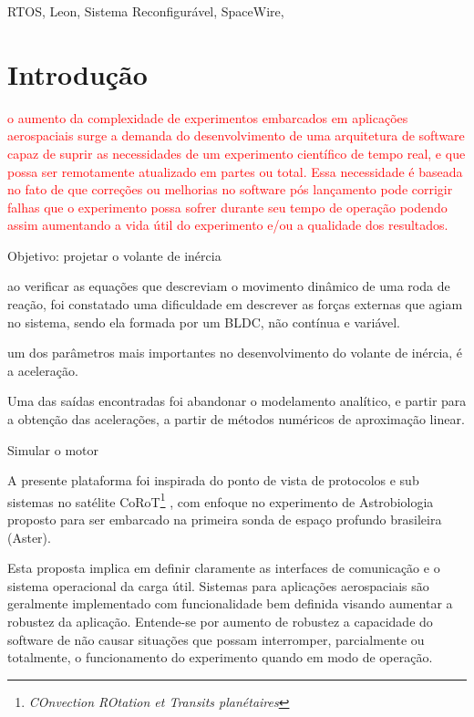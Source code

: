 \documentclass[journal,a4paper,oneside,twocolumn]{IEEEtran}
\begin{document}
\begin{IEEEkeywords}
	RTOS, Leon, Sistema Reconfigurável, SpaceWire, 
\end{IEEEkeywords}


\IEEEpeerreviewmaketitle



\section{Introdução}
\textcolor{red}{
	 o aumento da complexidade de experimentos embarcados em aplicações aerospaciais surge a demanda do desenvolvimento de uma arquitetura de software capaz de suprir as necessidades de um experimento científico  de tempo real, e que possa ser remotamente atualizado em partes ou total.
	Essa necessidade é baseada no fato de que correções ou melhorias no software pós lançamento pode corrigir falhas que o experimento possa sofrer durante seu tempo de operação podendo assim aumentando  a vida útil do experimento e/ou a qualidade dos resultados.}

	Objetivo: projetar o volante de inércia
	
	ao verificar as equações que descreviam o movimento dinâmico de uma roda de reação, foi constatado uma dificuldade em descrever as forças externas que agiam no sistema, sendo ela formada por um BLDC, não contínua e variável.
	
	um dos parâmetros mais importantes no desenvolvimento do volante de inércia, é a aceleração.
	
	Uma das saídas encontradas foi abandonar o modelamento analítico, e partir para a obtenção das acelerações, a partir de métodos numéricos de aproximação linear.
	
	Simular o motor
	
	
	
	 A presente plataforma foi inspirada do ponto de vista de protocolos e sub sistemas no satélite CoRoT\footnote{\textit{COnvection ROtation et Transits planétaires}} \cite{cailliau1999corot}, com enfoque no experimento de Astrobiologia proposto para ser  embarcado na primeira sonda de espaço profundo brasileira (Aster). 
	 
	 Esta proposta implica em definir claramente  as interfaces de comunicação e o sistema operacional da carga útil. Sistemas para aplicações aerospaciais são geralmente implementado com funcionalidade bem definida visando aumentar a robustez da aplicação. 	Entende-se por aumento de robustez a capacidade do software  de não causar situações que possam interromper, parcialmente ou totalmente, o funcionamento do experimento quando em modo de operação. 
	 
\end{document}
